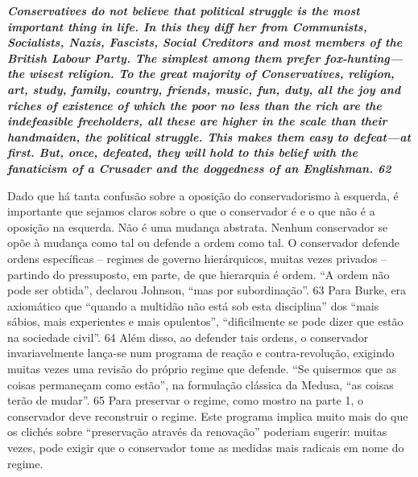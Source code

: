 \par
 

 \textbf{\textit{Conservatives do not believe that political struggle is the most important thing in life. In this they diff her from Communists, Socialists, Nazis, Fascists, Social Creditors and most members of the British Labour Party. The simplest among them prefer fox-hunting—the wisest religion. To the great majority of Conservatives, religion, art, study, family, country, friends, music, fun, duty, all the joy and riches of existence of which the poor no less than the rich are the indefeasible freeholders, all these are higher in the scale than their handmaiden, the political struggle. This makes them easy to defeat—at first. But, once, defeated, they will hold to this belief with the fanaticism of a Crusader and the doggedness of an Englishman. {{\color{blue} 62} } } }  
 
 
\par
 
Dado que há tanta confusão sobre a oposição do conservadorismo à esquerda, é importante que sejamos claros sobre o que o conservador é e o que não é a oposição na esquerda. Não é uma mudança abstrata. Nenhum conservador se opõe à mudança como tal ou defende a ordem como tal. O conservador defende ordens específicas – regimes de governo hierárquicos, muitas vezes privados – partindo do pressuposto, em parte, de que hierarquia é ordem. “A ordem não pode ser obtida”, declarou Johnson, “mas por subordinação”.
 {\color{blue} 63}  
Para Burke, era axiomático que “quando a multidão não está sob esta disciplina” dos “mais sábios, mais experientes e mais opulentos”, “dificilmente se pode dizer que estão na sociedade civil”.
 {\color{blue} 64}  
Além disso, ao defender tais ordens, o conservador invariavelmente lança-se num programa de reação e contra-revolução, exigindo muitas vezes uma revisão do próprio regime que defende. “Se quisermos que as coisas permaneçam como estão”, na formulação clássica da Medusa, “as coisas terão de mudar”.
 {\color{blue} 65}  
Para preservar o regime, como mostro na parte 1, o conservador deve reconstruir o regime. Este programa implica muito mais do que os clichés sobre “preservação através da renovação” poderiam sugerir: muitas vezes, pode exigir que o conservador tome as medidas mais radicais em nome do regime.
 
\par
 
